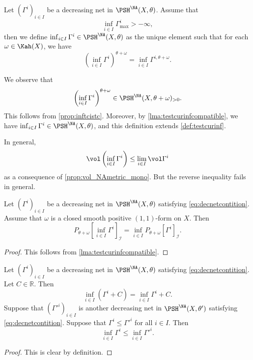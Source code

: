 \begin{definition}\label{def:NApotential:L525}
    Let $(\Gamma^i)_{i\in I}$ be a decreasing net in $\PSH^{\NA}(X,\theta)$. Assume that
    \begin{equation}\label{eq:decnetcontition}
    \inf_{i\in I}\Gamma^i_{\max}>-\infty,
    \end{equation}
    then we define $\inf_{i\in I}\Gamma^i\in \PSH^{\NA}(X,\theta)$ as the unique element such that for each $\omega\in \Kah(X)$, we have
    \begin{equation}\label{eq:decnettestcurdef}
    \left( \inf_{i\in I}\Gamma^i \right)^{\theta+\omega}=\inf_{i\in I} \Gamma^{i,\theta+\omega}.
    \end{equation}
\end{definition}
We observe that
\[
\left( \inf_{i\in I}\Gamma^i \right)^{\theta+\omega}\in \PSH^{\NA}(X,\theta+\omega)_{>0}.
\]
This follows from \cref{prop:inftcistc}. Moreover, by \cref{lma:testcurinfcompatible}, we have $\inf_{i\in I}\Gamma^i\in \PSH^{\NA}(X,\theta)$, and this definition extends \cref{def:testcurinf}.

In general,
\[
\vol \left( \inf_{i\in I}\Gamma^i \right)\leq \lim_{i\in I} \vol \Gamma^i
\]
as a consequence of \cref{prop:vol_NAmetric_mono}. But the reverse inequality fails in general.

\begin{proposition}\label{prop:NApotential:L548}
    Let $(\Gamma^i)_{i\in I}$ be a decreasing net in $\PSH^{\NA}(X,\theta)$ satisfying \eqref{eq:decnetcontition}. Assume that $\omega$ is a closed smooth positive $(1,1)$-form on $X$. Then
    \[
    P_{\theta+\omega}\left[ \inf_{i\in I} \Gamma^{i} \right]_{\mathcal{I}}= \inf_{i\in I} P_{\theta+\omega}\left[ \Gamma^{i} \right]_{\mathcal{I}}.
    \]
\end{proposition}
\begin{proof}
    This follows from \cref{lma:testcurinfcompatible}.
\end{proof}

\begin{proposition}\label{prop:infGammiotherprop2}
    Let $(\Gamma^i)_{i\in I}$ be a decreasing net in $\PSH^{\NA}(X,\theta)$ satisfying \eqref{eq:decnetcontition}. Let $C\in \mathbb{R}$. Then
    \[
    \inf_{i\in I} (\Gamma^i+C)=\inf_{i\in I} \Gamma^i+C.
    \]
    Suppose that $(\Gamma'^i)_{i\in I}$ is another decreasing net in $\PSH^{\NA}(X,\theta')$ satisfying \eqref{eq:decnetcontition}. Suppose that $\Gamma^i\leq \Gamma'^i$ for all $i\in I$. Then
    \[
    \inf_{i\in I}\Gamma^i\leq \inf_{i\in I}\Gamma'^i.
    \]
\end{proposition}
\begin{proof}
    This is clear by definition.
\end{proof}

